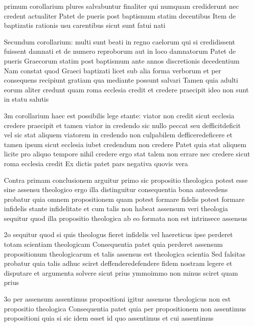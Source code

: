 \documentclass[twoside, openright]{article}
\begin{document}
        \pstart
        primum corollarium plures salvabuntur finaliter qui numquam crediderunt nec credent actualiter Patet de pueris post baptismum statim decentibus Item de baptizatis rationis usu carentibus sicut sunt fatui nati
        \pend
     
        \pstart
        Secundum corollarium: multi sunt beati in regno caelorum qui si credidissent fuissent damnati et de numero reproborum aut in loco damnatorum Patet de pueris Graecorum statim post baptismum ante annos discretionis decedentium Nam constat quod Graeci baptizati licet sub alia forma verborum et per consequens recipiunt gratiam qua mediante possunt salvari Tamen quia adulti eorum aliter credunt quam roma ecclesia credit et credere praecipit ideo non sunt in statu salutis
        \pend
     
        \pstart
        3m corollarium haec est possibilis lege stante: viator non credit sicut ecclesia credere praecipit et tamen viator in credendo sic nullo peccat seu defficitdeficit vel sic stat aliquem viatorem in credendo non culpabilem defficeredeficere et tamen ipsum sicut ecclesia iubet credendum non credere Patet quia stat aliquem licite pro aliquo tempore nihil credere ergo stat talem non errare nec credere sicut roma ecclesia credit Ex dictis patet pars negativa quovis vera
        \pend
     
        \pstart
        Contra primam conclusionem arguitur primo sic propositio theologica potest esse sine assensu theologico ergo illa distinguitur consequentia bona antecedens probatur quia omnem propositionem quam potest formare fidelis potest formare infidelis stante infidelitate et cum talis non habeat assensum veri theologia sequitur quod illa propositio theologica ab eo formata non est intrinsece assensus
        \pend
     
        \pstart
        2o sequitur quod si quis theologus fieret infidelis vel haereticus ipse perderet totam scientiam theologicam Consequentia patet quia perderet assensum propositionum theologicarum et talis assensus est theologica scientia Sed falsitas probatur quia talis adhuc sciret deffenderedefendere fidem nostram legere et disputare et argumenta solvere sicut prius ymmoimmo non minus sciret quam prius 
        \pend
     
        \pstart
        3o per assensum assentimus propositioni igitur assensus theologicus non est propositio theologica Consequentia patet quia per propositionem non assentimus propositioni quia si sic idem esset id quo assentimus et cui assentimus
        \pend
     
\end{document}
